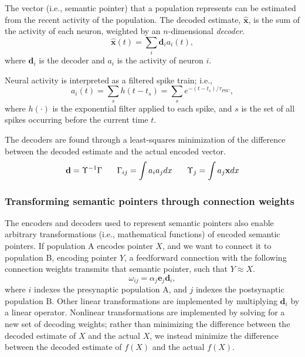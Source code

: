 \documentclass[10pt,letterpaper]{article}
\begin{document}
The vector (i.e., semantic pointer)
that a population represents
can be estimated from the recent activity
of the population.
The decoded estimate, $\mathbf{\hat{x}}$,
is the sum of the activity of each neuron,
weighted by an $n$-dimensional \textit{decoder}.
\begin{equation}
  \mathbf{\hat{x}}(t) = \sum_i \mathbf{d}_i a_i(t),
\end{equation}
where $\mathbf{d}_i$ is the decoder
and $a_i$ is the activity of neuron $i$.

Neural activity is interpreted as a
filtered spike train; i.e.,
\begin{equation} \label{eq:filter-spikes}
  a_i(t) = \sum_s h(t - t_s) = \sum_s e^{-(t - t_s) / \tau_{PSC}},
\end{equation}
where $h(\cdot)$ is the exponential filter
applied to each spike,
and $s$ is the set of all spikes occurring
before the current time $t$.

The decoders are found through a least-squares minimization
of the difference between the decoded estimate
and the actual encoded vector.
\begin{equation} \label{eq:decoders}
  \mathbf{d} = \Upsilon^{-1} \Gamma \hspace{1.8em}
  \Gamma_{ij} = \int a_i a_j dx \hspace{1.8em}
  \Upsilon_j = \int a_j \mathbf{x} dx
\end{equation}

\subsubsection{Transforming semantic pointers through connection weights}

The encoders and decoders used to represent semantic pointers
also enable arbitrary transformations
(i.e., mathematical functions) of encoded semantic pointers.
If population A encodes pointer $X$,
and we want to connect it to population B, encoding pointer $Y$,
a feedforward connection with the following connection weights
transmits that semantic pointer, such that $Y \approx X$.
\begin{equation}
  \omega_{ij} = \alpha_j \mathbf{e}_j \mathbf{d}_i,
\end{equation}
where $i$ indexes the presynaptic population A,
and $j$ indexes the postsynaptic population B.
Other linear transformations
are implemented by multiplying $\mathbf{d}_i$
by a linear operator.
Nonlinear transformations are implemented
by solving for a new set of decoding weights;
rather than minimizing the difference
between the decoded estimate of $X$ and the actual $X$,
we instead minimize the difference between
the decoded estimate of $f(X)$ and the actual $f(X)$.
\end{document}
